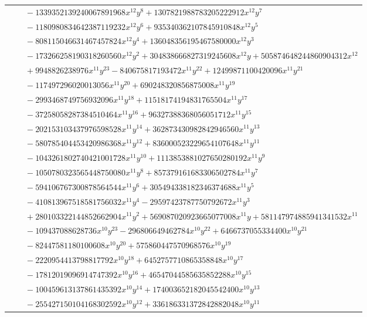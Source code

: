 \documentclass[11pt]{article}
\begin{document}
\begin{longtable}{@{}ll@{}}
 & $\quad -1339352139240067891968x^{12}y^{8}+1307821988783205222912x^{12}y^{7}$\\
 & $\quad -1180980834642387119232x^{12}y^{6}+935340362107845910848x^{12}y^{5}$\\
 & $\quad -808115046631467457824x^{12}y^{4}+136048356195467580000x^{12}y^{3}$\\
 & $\quad -173266258190318260560x^{12}y^{2}+304838666827319245608x^{12}y+505874648244860904312x^{12}$\\
 & $\quad +9948826238976x^{11}y^{23}-840675817193472x^{11}y^{22}+12499871100420096x^{11}y^{21}$\\
 & $\quad -117497296020013056x^{11}y^{20}+690248320856875008x^{11}y^{19}$\\
 & $\quad -2993468749756932096x^{11}y^{18}+11518174194831765504x^{11}y^{17}$\\
 & $\quad -37258058287384510464x^{11}y^{16}+96327388368056051712x^{11}y^{15}$\\
 & $\quad -202153103437976598528x^{11}y^{14}+362873430982842946560x^{11}y^{13}$\\
 & $\quad -580785404453420986368x^{11}y^{12}+836000523229654107648x^{11}y^{11}$\\
 & $\quad -1043261802740421001728x^{11}y^{10}+1113853881027650280192x^{11}y^{9}$\\
 & $\quad -1050780323565448750080x^{11}y^{8}+857379161683306502784x^{11}y^{7}$\\
 & $\quad -594106767300878564544x^{11}y^{6}+305494338182346374688x^{11}y^{5}$\\
 & $\quad -410813967518581756032x^{11}y^{4}-29597423787750792672x^{11}y^{3}$\\
 & $\quad +280103322144852662904x^{11}y^{2}+569087020923665077008x^{11}y+581147974885941341532x^{11}$\\
 & $\quad -109437088628736x^{10}y^{23}-296806649462784x^{10}y^{22}+6466737055334400x^{10}y^{21}$\\
 & $\quad -82447581180100608x^{10}y^{20}+575860447570968576x^{10}y^{19}$\\
 & $\quad -2220954413798817792x^{10}y^{18}+6452757710865358848x^{10}y^{17}$\\
 & $\quad -17812019096914747392x^{10}y^{16}+46547044585635852288x^{10}y^{15}$\\
 & $\quad -100459613137861435392x^{10}y^{14}+174003652182045542400x^{10}y^{13}$\\
 & $\quad -255427150104168302592x^{10}y^{12}+336186331372842882048x^{10}y^{11}$\\

\end{longtable}
\end{document}
